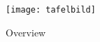 \newpage
\visHeader

\vspace*{3cm}

\begin{figure}[htbp]
	\centering
  \texttt{[image: tafelbild]}
	\caption{Overview}
	\label{fig_Overview}
\end{figure}